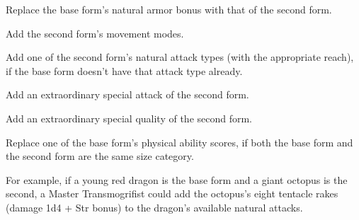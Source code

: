 \begin{itemize*}
\item Replace the base form’s natural armor bonus with that of the second form.
\item Add the second form’s movement modes.
\item Add one of the second form’s natural attack types (with the appropriate reach), if the base form doesn’t have that attack type already.
\item Add an extraordinary special attack of the second form.
\item Add an extraordinary special quality of the second form.
\item Replace one of the base form’s physical ability scores, if both the base form and the second form are the same size category.
\end{itemize*}

For example, if a young red dragon is the base form and a giant octopus is the second, a Master Transmogrifist could add the octopus’s eight tentacle rakes (damage 1d4 + Str bonus) to the dragon’s available natural attacks.
